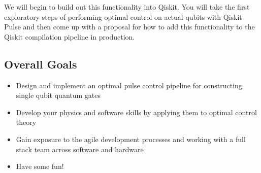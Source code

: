 \documentclass[11pt, letterpaper]{article}
\begin{document}
We will begin to build out this functionality into Qiskit.
You will take the first exploratory steps of performing optimal control on actual qubits with Qiskit
Pulse and then come up with a proposal for how to add this functionality
to the Qiskit compilation pipeline in production.

\subsection{Overall Goals}
\begin{itemize}
\item Design and implement an optimal pulse control pipeline for constructing single qubit quantum gates
\item Develop your physics and software skills by applying them to optimal control theory
\item Gain exposure to the agile development processes and working with a full stack team across software and hardware
\item Have some fun!
\end{itemize}
\end{document}
